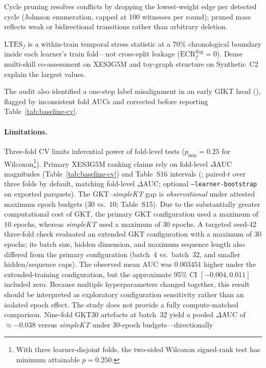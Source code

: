 \documentclass[preprint,10pt,doubleblind]{elsarticle}
\begin{document}
Cycle pruning resolves conflicts by dropping the lowest-weight edge per detected
cycle (Johnson enumeration, capped at 100 witnesses per round); pruned mass
reflects weak or bidirectional transitions rather than arbitrary deletion.

$\mathrm{LTES}_f$ is a within-train temporal stress statistic at a $70\%$
chronological boundary inside each learner's train fold---not cross-split
leakage ($\mathrm{ECR}^{\mathrm{flag}}_f{=}0$). Dense multi-skill
co-assessment on XES3G5M and toy-graph structure on Synthetic~C2 explain the
largest values.

The audit also identified a one-step label misalignment in an early GIKT head
(), flagged by inconsistent fold AUCs and corrected
before reporting Table~\ref{tab:baseline-cv}.

\paragraph{Limitations.}\label{sec:limitations}
Three-fold CV limits inferential power of fold-level tests ($p_{\min}{=}0.25$ for
Wilcoxon\footnote{With three learner-disjoint folds, the two-sided Wilcoxon signed-rank test has minimum attainable $p{=}0.250$.}).
Primary XES3G5M ranking claims rely on fold-level $\Delta$AUC
magnitudes (Table~\ref{tab:baseline-cv}) and Table~S16 intervals
(; paired-$t$ over three folds by default,
matching fold-level $\Delta$AUC; optional \texttt{--learner-bootstrap} on
exported parquets). The GKT--\textit{simpleKT}
gap is \emph{observational} under attested maximum epoch budgets (30 vs.\ 10; Table~S15).
Due to the substantially greater computational cost of GKT, the
primary GKT configuration used a maximum of 10 epochs, whereas
\textit{simpleKT} used a maximum of 30 epochs. A targeted seed-42
three-fold check evaluated an extended GKT configuration with a
maximum of 30 epochs; its batch size, hidden dimension, and maximum sequence
length also differed from the primary configuration (batch~4 vs.\ batch~32,
and smaller hidden/sequence caps). The observed mean AUC was
$0.003451$ higher under the extended-training configuration, but the
approximate 95\% CI $[-0.004,0.011]$ included zero. Because multiple
hyperparameters changed together, this result should be interpreted as exploratory
configuration sensitivity rather than an isolated epoch effect. The
study does not provide a fully compute-matched comparison. Nine-fold GKT30
artefacts at batch~32 yield a pooled $\Delta$AUC of
${\approx}{-}0.038$ versus \textit{simpleKT} under 30-epoch budgets---directionally
\end{document}
